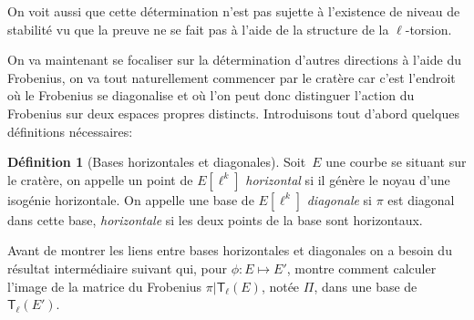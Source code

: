 \documentclass[10pt,a4paper]{book}
\theoremstyle{plain}
\theoremstyle{definition}
\theoremstyle{definition}
\theoremstyle{definition}
\theoremstyle{definition}
\theoremstyle{definition}
\newtheorem{defi}[thm]{Définition}
\theoremstyle{remark}
\theoremstyle{remark}
\theoremstyle{definition}
\begin{document}
On voit aussi que cette détermination n'est pas sujette à l'existence de niveau
de stabilité vu que la preuve ne se fait pas à l'aide de la structure de la 
$\ell$-torsion.

On va maintenant se focaliser sur la détermination d'autres directions à l'aide
du Frobenius, on va tout naturellement commencer par le cratère car c'est 
l'endroit où le Frobenius se diagonalise et où l'on peut donc distinguer 
l'action du Frobenius sur deux espaces propres distincts. Introduisons tout 
d'abord quelques définitions nécessaires:


\begin{defi}[Bases horizontales et diagonales]
  Soit~$E$ une courbe se situant sur le cratère, 
  on appelle un point de $E[\ell^k]$ \emph{horizontal} 
  si il génère le noyau d'une isogénie horizontale. 
  On appelle une base de $E[\ell^k]$ \emph{diagonale} 
  si $\pi$ est diagonal dans cette base, \emph{horizontale} si 
  les deux points de la base sont horizontaux.
\end{defi}

Avant de montrer les liens entre bases horizontales et diagonales on a besoin du résultat intermédiaire suivant qui, pour $\phi:E \mapsto E'$, montre comment calculer l'image de la matrice du Frobenius $\pi|\mathsf{T}_{\ell}(E)$, notée $\Pi$, dans une base de $\mathsf{T}_{\ell}(E')$.
\end{document}
